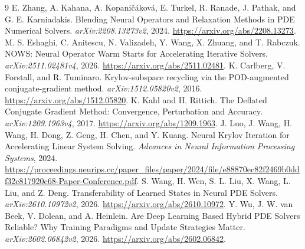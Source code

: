 \begin{thebibliography}{9}
 E. Zhang, A. Kahana, A. Kopani\v{c}\'{a}kov\'{a}, E. Turkel, R. Ranade, J. Pathak, and G. E. Karniadakis. Blending Neural Operators and Relaxation Methods in PDE Numerical Solvers. \emph{arXiv:2208.13273v2}, 2024. \url{https://arxiv.org/abs/2208.13273}.
 M. S. Eshaghi, C. Anitescu, N. Valizadeh, Y. Wang, X. Zhuang, and T. Rabczuk. NOWS: Neural Operator Warm Starts for Accelerating Iterative Solvers. \emph{arXiv:2511.02481v4}, 2026. \url{https://arxiv.org/abs/2511.02481}.
 K. Carlberg, V. Forstall, and R. Tuminaro. Krylov-subspace recycling via the POD-augmented conjugate-gradient method. \emph{arXiv:1512.05820v2}, 2016. \url{https://arxiv.org/abs/1512.05820}.
 K. Kahl and H. Rittich. The Deflated Conjugate Gradient Method: Convergence, Perturbation and Accuracy. \emph{arXiv:1209.1963v4}, 2017. \url{https://arxiv.org/abs/1209.1963}.
 J. Luo, J. Wang, H. Wang, H. Dong, Z. Geng, H. Chen, and Y. Kuang. Neural Krylov Iteration for Accelerating Linear System Solving. \emph{Advances in Neural Information Processing Systems}, 2024. \url{https://proceedings.neurips.cc/paper_files/paper/2024/file/e88870ec82f2469b0ddf32c817920c68-Paper-Conference.pdf}.
 S. Wang, H. Wen, S. L. Liu, X. Wang, L. Liu, and Z. Deng. Transferability of Learned States in Neural PDE Solvers. \emph{arXiv:2610.10972v2}, 2026. \url{https://arxiv.org/abs/2610.10972}.
 Y. Wu, J. W. van Beek, V. Dolean, and A. Heinlein. Are Deep Learning Based Hybrid PDE Solvers Reliable? Why Training Paradigms and Update Strategies Matter. \emph{arXiv:2602.06842v2}, 2026. \url{https://arxiv.org/abs/2602.06842}.
\end{thebibliography}
